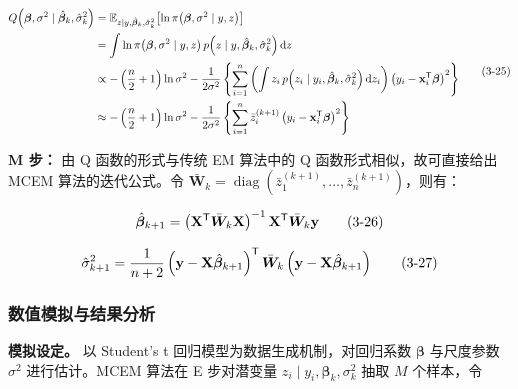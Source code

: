 \documentclass[12pt,a4paper]{ctexart}
\makeatletter
\numberwithin{figure}{section}
\numberwithin{table}{section}
\let\ltx@orig@tag\tag
\renewcommand{\tag}[1]{\refstepcounter{equation}\ltx@orig@tag{#1}}%
\makeatother
\begin{document}
\begin{equation}
\begin{aligned}
Q\!\left(\boldsymbol{\beta}, \sigma^2 \mid \hat{\boldsymbol{\beta}}_k, \hat{\sigma}_k^2\right)
&= \mathbb{E}_{z \mid y, \hat{\boldsymbol{\beta}}_k, \hat{\sigma}_k^2}\!\left[\ln \pi\!\left(\boldsymbol{\beta}, \sigma^2 \mid y, z\right)\right] \\
&= \int \ln \pi\!\left(\boldsymbol{\beta}, \sigma^2 \mid y, z\right) p\!\left(z \mid y, \hat{\boldsymbol{\beta}}_k, \hat{\sigma}_k^2\right) \mathrm{d}z \\
&\propto -\left(\frac{n}{2}+1\right)\ln \sigma^2 - \frac{1}{2\sigma^2}\left\{\sum_{i=1}^{n}\left(\int z_i\, p\!\left(z_i \mid y_i, \hat{\boldsymbol{\beta}}_k, \hat{\sigma}_k^2\right)\mathrm{d}z_i\right)\left(y_i - \mathbf{x}_i^{\mathsf{T}}\boldsymbol{\beta}\right)^2\right\} \\
&\approx -\left(\frac{n}{2}+1\right)\ln \sigma^2 - \frac{1}{2\sigma^2}\left\{\sum_{i=1}^{n}\bar{z}_i^{(k+1)}\left(y_i - \mathbf{x}_i^{\mathsf{T}}\boldsymbol{\beta}\right)^2\right\}
\end{aligned} \tag{3-25}
\end{equation}

\textbf{M 步：} 由 Q 函数的形式与传统 EM 算法中的 Q 函数形式相似，故可直接给出 MCEM 算法的迭代公式。令 $\bar{\boldsymbol{W}}_k = \operatorname{diag}\!\left(\bar{z}_1^{(k+1)}, \ldots, \bar{z}_n^{(k+1)}\right)$，则有：

\begin{equation}
\hat{\boldsymbol{\beta}}_{k+1} = \left(\mathbf{X}^{\mathsf{T}} \bar{\boldsymbol{W}}_k \mathbf{X}\right)^{-1}\mathbf{X}^{\mathsf{T}} \bar{\boldsymbol{W}}_k \mathbf{y} \tag{3-26}
\end{equation}

\begin{equation}
\hat{\sigma}_{k+1}^2 = \frac{1}{n+2}\left(\mathbf{y} - \mathbf{X}\hat{\boldsymbol{\beta}}_{k+1}\right)^{\mathsf{T}} \bar{\boldsymbol{W}}_k \left(\mathbf{y} - \mathbf{X}\hat{\boldsymbol{\beta}}_{k+1}\right) \tag{3-27}
\end{equation}

\subsubsection{数值模拟与结果分析}

\textbf{模拟设定。} 以 Student's t 回归模型为数据生成机制，对回归系数 $\boldsymbol{\beta}$ 与尺度参数 $\sigma^2$ 进行估计。MCEM 算法在 E 步对潜变量 $z_i\mid y_i,\boldsymbol{\beta}_k,\sigma_k^2$ 抽取 $M$ 个样本，令
\end{document}
